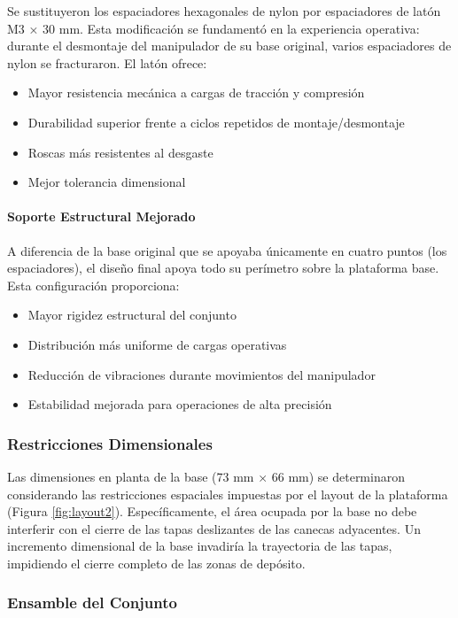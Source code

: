 Se sustituyeron los espaciadores hexagonales de nylon por espaciadores de latón M3 × 30 mm. Esta modificación se fundamentó en la experiencia operativa: durante el desmontaje del manipulador de su base original, varios espaciadores de nylon se fracturaron. El latón ofrece:
\begin{itemize}
    \item Mayor resistencia mecánica a cargas de tracción y compresión
    \item Durabilidad superior frente a ciclos repetidos de montaje/desmontaje
    \item Roscas más resistentes al desgaste
    \item Mejor tolerancia dimensional
\end{itemize}

\paragraph{Soporte Estructural Mejorado}

A diferencia de la base original que se apoyaba únicamente en cuatro puntos (los espaciadores), el diseño final apoya todo su perímetro sobre la plataforma base. Esta configuración proporciona:
\begin{itemize}
    \item Mayor rigidez estructural del conjunto
    \item Distribución más uniforme de cargas operativas
    \item Reducción de vibraciones durante movimientos del manipulador
    \item Estabilidad mejorada para operaciones de alta precisión
\end{itemize}

\subsubsection{Restricciones Dimensionales}

Las dimensiones en planta de la base (73 mm × 66 mm) se determinaron considerando las restricciones espaciales impuestas por el layout de la plataforma (Figura \ref{fig:layout2}). Específicamente, el área ocupada por la base no debe interferir con el cierre de las tapas deslizantes de las canecas adyacentes. Un incremento dimensional de la base invadiría la trayectoria de las tapas, impidiendo el cierre completo de las zonas de depósito.

\subsubsection{Ensamble del Conjunto}

